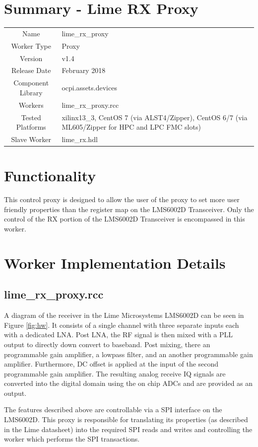 \documentclass{article}
\author{} %
\date{Version \docVersion} %
\title{\docTitle}
\def\docVersion{1.4}
\def\comp{lime\_rx\_proxy}
\def\Comp{Lime RX Proxy}
\begin{document}
\section*{Summary - \Comp}
\begin{tabular}{|c|M{13.5cm}|}
	\hline
	                  &                \\
	\hline
	Name              & \comp          \\
	\hline
	Worker Type       & Proxy          \\
	\hline
	Version           & v\docVersion \\
	\hline
	Release Date      & February 2018 \\
	\hline
	Component Library & ocpi.assets.devices   \\
	\hline
	Workers           & \comp.rcc      \\
	\hline
	Tested Platforms  & xilinx13\_3, CentOS 7 (via ALST4/Zipper), CentOS 6/7 (via ML605/Zipper for HPC and LPC FMC slots) \\
	\hline
	Slave Worker      & lime\_rx.hdl   \\
	\hline
\end{tabular}

\section*{Functionality}
This control proxy is designed to allow the user of the proxy to set more user friendly properties than the register map on the LMS6002D Transceiver.  Only the control of the RX portion of the LMS6002D Transceiver is encompassed in this worker.

\section*{Worker Implementation Details}
\subsection*{\comp.rcc}
A diagram of the receiver in the Lime Microsystems LMS6002D can be seen in Figure \ref{fig:hw}. It consists of a single channel with three separate inputs each with a dedicated LNA. Post LNA, the RF signal is then mixed with a PLL output to directly down convert to baseband. Post mixing, there an programmable gain amplifier, a lowpass filter, and an another programmable gain amplifier. Furthermore, DC offset is applied at the input of the second programmable gain amplifier. The resulting analog receive IQ signals are converted into the digital domain using the on chip ADCs and are provided as an output.\par\medskip
\noindent The features described above are controllable via a SPI interface on the LMS6002D. This proxy is responsible for translating its properties (as described in the Lime datasheet) into the required SPI reads and writes and controlling the worker which performs the SPI transactions.
\newpage
\end{document}
